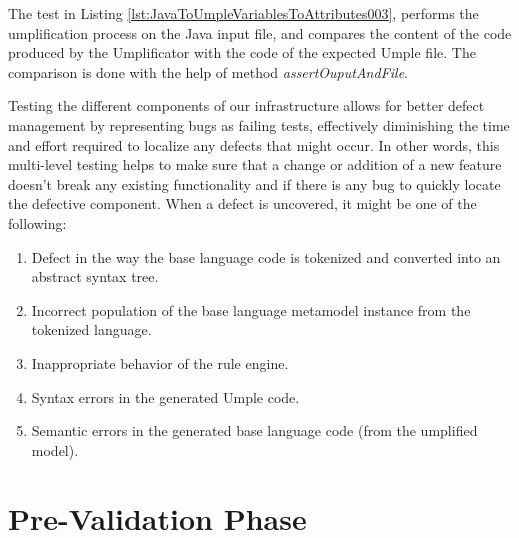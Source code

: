The test in Listing \ref{lst:JavaToUmpleVariablesToAttributes003}, performs the umplification process on the Java input file, and compares the content of the code produced by the Umplificator with the code of the expected Umple file. The comparison is done with the help of method \textit{assertOuputAndFile}.

Testing the different components of our infrastructure allows for better defect management by representing bugs as failing tests, effectively diminishing the time and effort required to localize any defects that might occur. In other words, this multi-level testing helps to make sure that a change or addition of a new feature doesn't break any existing functionality and if there is any bug to quickly locate the defective component. When a defect is uncovered, it might be one of the following:


\begin{enumerate}
\item Defect in the way the base language code is tokenized and converted into an abstract syntax tree.

\item Incorrect population of the base language metamodel instance from the tokenized language.

\item Inappropriate behavior of the rule engine.

\item Syntax errors in the generated Umple code.

\item Semantic errors in the generated base language code (from the umplified model).
\end{enumerate}

\section{Pre-Validation Phase}


